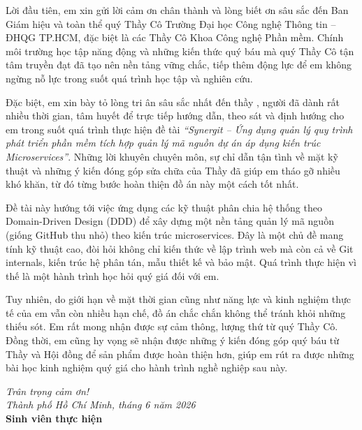 
\hspace{1.2em}Lời đầu tiên, em xin gửi lời cảm ơn chân thành và lòng biết ơn sâu sắc đến Ban Giám hiệu và toàn thể quý Thầy Cô Trường Đại học Công nghệ Thông tin -- ĐHQG TP.HCM, đặc biệt là các Thầy Cô Khoa Công nghệ Phần mềm. Chính môi trường học tập năng động và những kiến thức quý báu mà quý Thầy Cô tận tâm truyền đạt đã tạo nên nền tảng vững chắc, tiếp thêm động lực để em không ngừng nỗ lực trong suốt quá trình học tập và nghiên cứu.

\hspace{1.2em}Đặc biệt, em xin bày tỏ lòng tri ân sâu sắc nhất đến thầy \GVHD, người đã dành rất nhiều thời gian, tâm huyết để trực tiếp hướng dẫn, theo sát và định hướng cho em trong suốt quá trình thực hiện đề tài \textit{``Synergit -- Ứng dụng quản lý quy trình phát triển phần mềm tích hợp quản lý mã nguồn dự án áp dụng kiến trúc Microservices''}. Những lời khuyên chuyên môn, sự chỉ dẫn tận tình về mặt kỹ thuật và những ý kiến đóng góp sửa chữa của Thầy đã giúp em tháo gỡ nhiều khó khăn, từ đó từng bước hoàn thiện đồ án này một cách tốt nhất.

\hspace{1.2em}Đề tài này hướng tới việc ứng dụng các kỹ thuật phân chia hệ thống theo Domain-Driven Design (DDD) để xây dựng một nền tảng quản lý mã nguồn (giống GitHub thu nhỏ) theo kiến trúc microservices. Đây là một chủ đề mang tính kỹ thuật cao, đòi hỏi không chỉ kiến thức về lập trình web mà còn cả về Git internals, kiến trúc hệ phân tán, mẫu thiết kế và bảo mật. Quá trình thực hiện vì thế là một hành trình học hỏi quý giá đối với em.

\hspace{1.2em}Tuy nhiên, do giới hạn về mặt thời gian cũng như năng lực và kinh nghiệm thực tế của em vẫn còn nhiều hạn chế, đồ án chắc chắn không thể tránh khỏi những thiếu sót. Em rất mong nhận được sự cảm thông, lượng thứ từ quý Thầy Cô. Đồng thời, em cũng hy vọng sẽ nhận được những ý kiến đóng góp quý báu từ Thầy và Hội đồng để sản phẩm được hoàn thiện hơn, giúp em rút ra được những bài học kinh nghiệm quý giá cho hành trình nghề nghiệp sau này.

\begin{flushright}
\textit{Trân trọng cảm ơn!}\\
\textit{Thành phố Hồ Chí Minh, tháng 6 năm 2026}\\
\textbf{Sinh viên thực hiện}\\
\SVMot
\end{flushright}
\clearpage
